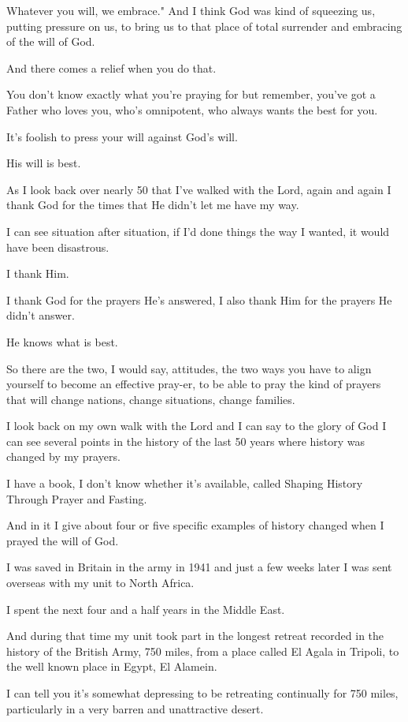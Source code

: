 \documentclass[11pt]{article}
\begin{document}
Whatever you will, we embrace." And I think
God was kind of squeezing us, putting pressure
on us, to bring us to that place of total
surrender and embracing of the will of God.

And there comes a relief when you do that.

You don't know exactly what you're praying for
but remember, you've got a Father who loves
you, who's omnipotent, who always wants the
best for you.

It's foolish to press your will against God's
will.

His will is best.

As I look back over nearly 50 that I've walked
with the Lord, again and again I thank God for
the times that He didn't let me have my way.

I can see situation after situation, if I'd
done things the way I wanted, it would have
been disastrous.

I thank Him.

I thank God for the prayers He's answered, I
also thank Him for the prayers He didn't
answer.

He knows what is best.

So there are the two, I would say, attitudes,
the two ways you have to align yourself to
become an effective pray-er, to be able to
pray the kind of prayers that will change
nations, change situations, change families.

I look back on my own walk with the Lord and I
can say to the glory of God I can see several
points in the history of the last 50 years
where history was changed by my prayers.

I have a book, I don't know whether it's
available, called Shaping History Through
Prayer and Fasting.

And in it I give about four or five specific
examples of history changed when I prayed the
will of God.

I was saved in Britain in the army in 1941 and
just a few weeks later I was sent overseas
with my unit to North Africa.

I spent the next four and a half years in the
Middle East.

And during that time my unit took part in the
longest retreat recorded in the history of the
British Army, 750 miles, from a place called
El Agala in Tripoli, to the well known place
in Egypt, El Alamein.

I can tell you it's somewhat depressing to be
retreating continually for 750 miles,
particularly in a very barren and unattractive
desert.
\end{document}
